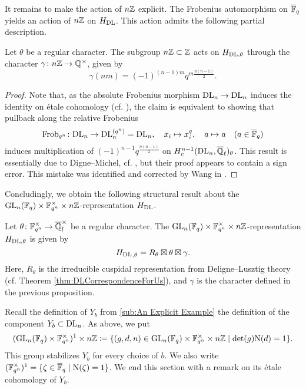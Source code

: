 \documentclass[../main.tex]{subfiles}
\begin{document}
It remains to make the action of $n\mathbb{Z}$ explicit. The Frobenius automorphism on
$\overline {\mathbb{F}}_q$ yields an action of $n\mathbb{Z}$ on $\hH_\DL$. This action admits the
following partial description.

\begin{prop}
  Let $\theta$ be a regular character. The subgroup $n\mathbb{Z} \subset \mathbb{Z}$ acts on
  $H_{\mathrm{DL},\theta}$ through the character $\gamma\colon 
  n\mathbb{Z} \to \mathbb{Q}^\times$, given by
  $$\gamma(nm) =  (-1)^{(n-1)m} q^{m \frac{n(n-1)}2}.$$
  \begin{proof}
    Note that, as the absolute Frobenius morphism $\mathrm{DL}_n \to \mathrm{DL}_n$
    induces the identity on \'etale cohomology (cf.
    \cite[\href{https://stacks.math.columbia.edu/tag/03SN}{Tag
    03SN}]{stacks-project}), the claim is equivalent to showing that pullback 
    along the relative Frobenius 
    \begin{equation*}
      \mathrm{Frob}_{q^n}\colon  \mathrm{DL}_n \to \mathrm{DL}_n^{(q^n)} = \mathrm{DL}_n, \quad
      x_i \mapsto x_i^q,\quad a \mapsto a \quad (a \in \overline {\mathbb{F}}_q)
    \end{equation*}
    induces multiplication of $(-1)^{n-1}q^{\frac{n(n-1)}2}$
    on $H^{n-1}_c(\mathrm{DL}_n, \overline {\mathbb{Q}}_\ell)_\theta$. 
    This result is essentially due to Digne--Michel, cf. \cite[Remarque
    3.14]{digne1985fonctions}, but their proof appears to contain a sign error.
    This mistake was identified and corrected by Wang in \cite[Théorème
    3.1.12]{wang2014espace}.
  \end{proof}
\end{prop}

Concludingly, we obtain the following structural result about the 
$\operatorname{GL}_n(\mathbb{F}_q) \times \mathbb{F}_{q^n}^\times \times n\mathbb{Z}$-representation 
$\hH_\DL$.

\begin{thm}[Structure of $\hH_\DL$]\label{thm:MainThmHDlStructure}
  Let $\theta\colon  \mathbb{F}_{q^n}^\times \to \overline {\mathbb{Q}}_l^\times$ be a regular character.  
  The $\operatorname{GL}_n(\mathbb{F}_q) \times \mathbb{F}_{q^n}^\times \times n\mathbb{Z}$-representation
  $H_{\mathrm{DL}, \theta}$ is given by 
  \begin{equation*}
    {H_\mathrm{DL}}_{,\theta} = R_\theta \boxtimes \theta \boxtimes \gamma.
  \end{equation*}
  Here, $R_\theta$ is the irreducible cuspidal representation from
  Deligne--Lusztig theory (cf. Theorem \ref{thm:DLCorrespondenceForUs}), and
  $\gamma$ is the character defined in the previous proposition.
\end{thm}

Recall the definition of $Y_b$ from \cref{sub:An Explicit Example} the definition
of the component $Y_b \subset \mathrm{DL}_n$. As above, we put
\begin{equation*}
  (\operatorname{GL}_n(\mathbb{F}_q) \times \mathbb{F}_{q^n}^\times)^1 \times n\mathbb{Z} 
  \coloneq \{(g,d,n) \in \operatorname{GL}_n(\mathbb{F}_q) \times \mathbb{F}_{q^n}^\times \times n\mathbb{Z} 
  \mid \det(g) \mathrm{N}(d) = 1\}.
\end{equation*}
This group stabilizes $Y_b$ for every choice of $b$. 
We also write $(\mathbb{F}_{q^n}^\times)^1 = \{\zeta \in {\overline{\mathbb{F}}_q} \mid \mathrm{N}(\zeta) =
1\}$. We end this section with a remark on its \'etale cohomology of $Y_b$.
\end{document}
